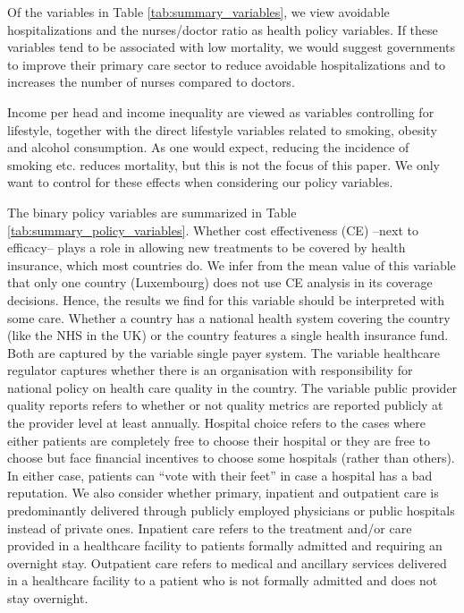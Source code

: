 \documentclass[a4paper,12pt]{article}
\begin{document}
Of the variables in Table \ref{tab:summary_variables}, we view avoidable hospitalizations and the nurses/doctor ratio as health policy variables. If these variables tend to be associated with low mortality, we would suggest governments to improve their primary care sector to reduce avoidable hospitalizations and to increases the number of nurses compared to doctors.

Income per head and income inequality are viewed as variables controlling for lifestyle, together with the direct lifestyle variables related to smoking, obesity and alcohol consumption. As one would expect, reducing the incidence of smoking etc. reduces mortality, but this is not the focus of this paper. We only want to control for these effects when considering our policy variables.

The binary policy variables are summarized in Table \ref{tab:summary_policy_variables}. Whether cost effectiveness (CE) --next to efficacy-- plays a role in allowing new treatments to be covered by health insurance, which most countries do. We infer from the mean value of this variable that only one country (Luxembourg) does not use CE analysis in its coverage decisions. Hence, the results we find for this variable should be interpreted with some care. Whether a country has a national health system covering the country (like the NHS in the UK) or the country features a single health insurance fund. Both are captured by the variable single payer system. The variable healthcare regulator captures whether there is an organisation with responsibility for national policy on health care quality in the country. The variable public provider quality reports refers to whether or not quality metrics are reported publicly at the provider level at least annually. Hospital choice refers to the cases where either patients are completely free to choose their hospital or they are free to choose but face financial incentives to choose some hospitals (rather than others). In either case, patients can ``vote with their feet'' in case a hospital has a bad reputation. We also consider whether primary, inpatient and outpatient care is predominantly delivered through publicly employed physicians or public hospitals instead of private ones. Inpatient care refers to the treatment and/or care provided in a healthcare facility to patients formally admitted and requiring an overnight stay. Outpatient care refers to medical and ancillary services delivered in a healthcare facility to a patient who is not formally admitted and does not stay overnight.
\end{document}
